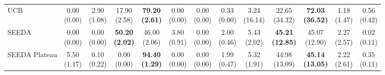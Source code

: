\begin{table}[H]
{\begin{tabular}{l|cccccc|cccccc}
UCB & \makecell{0.00 \\ (0.00)} & \makecell{2.90 \\ (1.08)} & {\cellcolor[HTML]{C8E6C9}} \makecell{17.90 \\ (2.58)} & \bfseries \makecell{79.20 \\ (2.61)} & \makecell{0.00 \\ (0.00)} & \makecell{0.00 \\ (0.00)} & \makecell{0.33 \\ (0.00)} & \makecell{3.24 \\ (16.14)} & {\cellcolor[HTML]{C8E6C9}} \makecell{22.65 \\ (34.32)} & \bfseries \makecell{72.03 \\ (36.52)} & \makecell{1.18 \\ (1.47)} & \makecell{0.56 \\ (0.42)} \\
SEEDA & \makecell{0.00 \\ (0.00)} & \makecell{0.00 \\ (0.00)} & {\cellcolor[HTML]{C8E6C9}} \bfseries \makecell{50.20 \\ (2.02)} & \makecell{46.00 \\ (2.06)} & \makecell{3.80 \\ (0.91)} & \makecell{0.00 \\ (0.00)} & \makecell{2.00 \\ (0.46)} & \makecell{5.43 \\ (2.02)} & {\cellcolor[HTML]{C8E6C9}} \bfseries \makecell{45.21 \\ (12.85)} & \makecell{45.07 \\ (12.90)} & \makecell{2.27 \\ (2.57)} & \makecell{0.02 \\ (0.11)} \\
SEEDA Plateau & \makecell{5.50 \\ (1.17)} & \makecell{0.10 \\ (0.22)} & {\cellcolor[HTML]{C8E6C9}} \makecell{0.00 \\ (0.00)} & \bfseries \makecell{94.40 \\ (1.29)} & \makecell{0.00 \\ (0.00)} & \makecell{0.00 \\ (0.00)} & \makecell{1.99 \\ (0.47)} & \makecell{5.32 \\ (1.91)} & {\cellcolor[HTML]{C8E6C9}} \makecell{44.98 \\ (13.09)} & \bfseries \makecell{45.14 \\ (13.05)} & \makecell{2.22 \\ (2.61)} & \makecell{0.35 \\ (0.11)} \\
\bottomrule
\end{tabular}
}%
\end{table}
